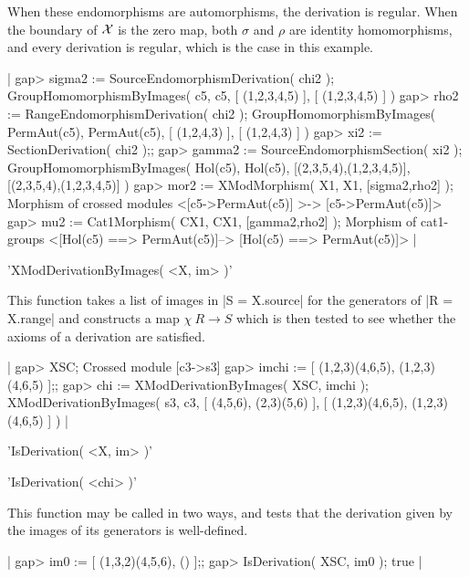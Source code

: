 When these endomorphisms are automorphisms, the derivation is regular.
When the boundary  of ${\cal X}$ is  the  zero map, both  $\sigma$ and
$\rho$ are identity  homomorphisms,  and every derivation  is regular,
which is the case in this example.

|    gap> sigma2 := SourceEndomorphismDerivation( chi2 );
    GroupHomomorphismByImages( c5, c5, [ (1,2,3,4,5) ], [ (1,2,3,4,5) ] )
    gap> rho2 := RangeEndomorphismDerivation( chi2 );
    GroupHomomorphismByImages( PermAut(c5), PermAut(c5), [ (1,2,4,3) ], 
       [ (1,2,4,3) ] )
    gap> xi2 := SectionDerivation( chi2 );;
    gap> gamma2 := SourceEndomorphismSection( xi2 );
    GroupHomomorphismByImages( Hol(c5), Hol(c5), [(2,3,5,4),(1,2,3,4,5)],
       [(2,3,5,4),(1,2,3,4,5)] )
    gap> mor2 := XModMorphism( X1, X1, [sigma2,rho2] );
    Morphism of crossed modules <[c5->PermAut(c5)] >-> [c5->PermAut(c5)]>
    gap> mu2 := Cat1Morphism( CX1, CX1, [gamma2,rho2] );
    Morphism of cat1-groups <[Hol(c5) ==> PermAut(c5)]-->
       [Hol(c5) ==> PermAut(c5)]>  |

%

'XModDerivationByImages( <X, im> )'

This   function takes a    list of images  in |S   = X.source| for the
generators of  |R = X.range|  and constructs a map $\chi  \: R  \to S$
which is  then tested to see whether   the axioms of  a derivation are
satisfied.

|    gap> XSC;
    Crossed module [c3->s3]
    gap> imchi := [ (1,2,3)(4,6,5), (1,2,3)(4,6,5) ];;
    gap> chi := XModDerivationByImages( XSC, imchi );
    XModDerivationByImages( s3, c3, [ (4,5,6), (2,3)(5,6) ], 
       [ (1,2,3)(4,6,5), (1,2,3)(4,6,5) ] )  |

%

'IsDerivation( <X, im> )'

'IsDerivation( <chi> )'

This function may be called in two ways, and tests that the derivation
given by the images of its generators is well-defined.

|    gap> im0 := [ (1,3,2)(4,5,6), () ];;
    gap> IsDerivation( XSC, im0 );
    true  |

%

